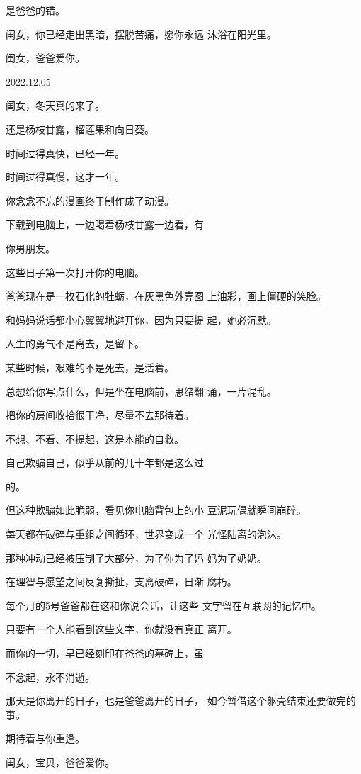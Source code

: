 \documentclass{article}
\begin{document}
\newpage

是爸爸的错。 

闺女，你已经走出黑暗，摆脱苦痛，愿你永远
沐浴在阳光里。 


闺女，爸爸爱你。 



2022.12.05 


闺女，冬天真的来了。 


还是杨枝甘露，榴莲果和向日葵。 


时间过得真快，已经一年。 


时间过得真慢，这才一年。 


你念念不忘的漫画终于制作成了动漫。 

下载到电脑上，一边喝着杨枝甘露一边看，有

\newpage
你男朋友。 


这些日子第一次打开你的电脑。 

爸爸现在是一枚石化的牡蛎，在灰黑色外壳图
上油彩，画上僵硬的笑脸。 

和妈妈说话都小心翼翼地避开你，因为只要提
起，她必沉默。 


人生的勇气不是离去，是留下。 


某些时候，艰难的不是死去，是活着。 

总想给你写点什么，但是坐在电脑前，思绪翻
涌，一片混乱。 


把你的房间收拾很干净，尽量不去那待着。 


不想、不看、不提起，这是本能的自救。 

自己欺骗自己，似乎从前的几十年都是这么过
\newpage

的。 

但这种欺骗如此脆弱，看见你电脑背包上的小
豆泥玩偶就瞬间崩碎。 

每天都在破碎与重组之间循环，世界变成一个
光怪陆离的泡沫。 

那种冲动已经被压制了大部分，为了你为了妈
妈为了奶奶。 

在理智与愿望之间反复撕扯，支离破碎，日渐
腐朽。 

每个月的5号爸爸都在这和你说会话，让这些
文字留在互联网的记忆中。 

只要有一个人能看到这些文字，你就没有真正
离开。 

而你的一切，早已经刻印在爸爸的墓碑上，虽
\newpage

不念起，永不消逝。 

那天是你离开的日子，也是爸爸离开的日子，
如今暂借这个躯壳结束还要做完的事。 


期待着与你重逢。 


闺女，宝贝，爸爸爱你。 
\end{document}

